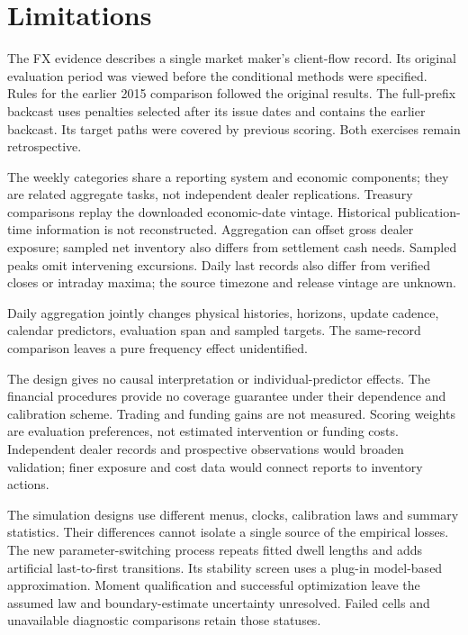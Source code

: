 \documentclass[11pt,a4paper]{article}
\begin{document}
\FloatBarrier

\section{Limitations}\label{sec:limitations}

The FX evidence describes a single market maker's client-flow record. Its original evaluation period was viewed before the conditional methods were specified. Rules for the earlier 2015 comparison followed the original results. The full-prefix backcast uses penalties selected after its issue dates and contains the earlier backcast. Its target paths were covered by previous scoring. Both exercises remain retrospective.

The weekly categories share a reporting system and economic components; they are related aggregate tasks, not independent dealer replications. Treasury comparisons replay the downloaded economic-date vintage. Historical publication-time information is not reconstructed. Aggregation can offset gross dealer exposure; sampled net inventory also differs from settlement cash needs. Sampled peaks omit intervening excursions. Daily last records also differ from verified closes or intraday maxima; the source timezone and release vintage are unknown.

Daily aggregation jointly changes physical histories, horizons, update cadence, calendar predictors, evaluation span and sampled targets. The same-record comparison leaves a pure frequency effect unidentified.

The design gives no causal interpretation or individual-predictor effects. The financial procedures provide no coverage guarantee under their dependence and calibration scheme. Trading and funding gains are not measured. Scoring weights are evaluation preferences, not estimated intervention or funding costs. Independent dealer records and prospective observations would broaden validation; finer exposure and cost data would connect reports to inventory actions.

The simulation designs use different menus, clocks, calibration laws and summary statistics. Their differences cannot isolate a single source of the empirical losses. The new parameter-switching process repeats fitted dwell lengths and adds artificial last-to-first transitions. Its stability screen uses a plug-in model-based approximation. Moment qualification and successful optimization leave the assumed law and boundary-estimate uncertainty unresolved. Failed cells and unavailable diagnostic comparisons retain those statuses.
\end{document}
